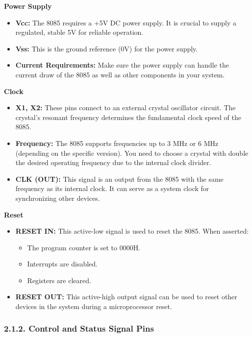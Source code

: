\documentclass[
]{article}
\begin{document}
\textbf{Power Supply}

\begin{itemize}
\item
  \textbf{Vcc:} The 8085 requires a +5V DC power supply. It is crucial
  to supply a regulated, stable 5V for reliable operation.
\item
  \textbf{Vss:} This is the ground reference (0V) for the power supply.
\item
  \textbf{Current Requirements:} Make sure the power supply can handle
  the current draw of the 8085 as well as other components in your
  system.
\end{itemize}

\textbf{Clock}

\begin{itemize}
\item
  \textbf{X1, X2:} These pins connect to an external crystal oscillator
  circuit. The crystal's resonant frequency determines the fundamental
  clock speed of the 8085.
\item
  \textbf{Frequency:} The 8085 supports frequencies up to 3 MHz or 6 MHz
  (depending on the specific version). You need to choose a crystal with
  double the desired operating frequency due to the internal clock
  divider.
\item
  \textbf{CLK (OUT):} This signal is an output from the 8085 with the
  same frequency as its internal clock. It can serve as a system clock
  for synchronizing other devices.
\end{itemize}

\textbf{Reset}

\begin{itemize}
\item
  \textbf{RESET IN:} This active-low signal is used to reset the 8085.
  When asserted:

  \begin{itemize}
  \item
    The program counter is set to 0000H.
  \item
    Interrupts are disabled.
  \item
    Registers are cleared.
  \end{itemize}
\item
  \textbf{RESET OUT:} This active-high output signal can be used to
  reset other devices in the system during a microprocessor reset.
\end{itemize}

\hypertarget{212-control-and-status-signal-pins}{%
\subsubsection{2.1.2. Control and Status Signal
Pins}\label{212-control-and-status-signal-pins}}
\end{document}

